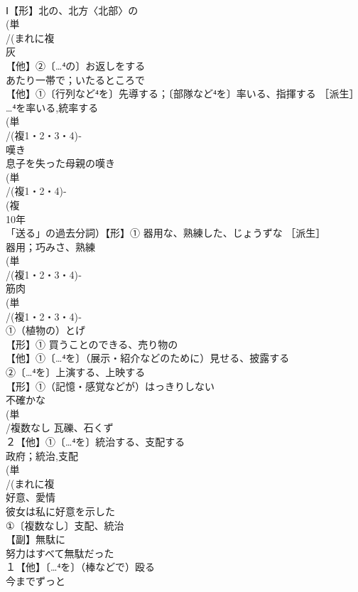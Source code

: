 \documentclass[8pt]{extreport}
\begin{document}
\begin{CJK}{UTF8}{min}
\\	Ⅰ【形】北の、北方〈北部〉の 
\\	(単
\\	/(まれに複
\\	灰 
\\	【他】②〔…⁴の〕お返しをする
\\	あたり一帯で；いたるところで
\\	【他】①〔行列など⁴を〕先導する；〔部隊など⁴を〕率いる、指揮する ［派生］ 
\\	…⁴を率いる,統率する
\\	(単
\\	/(複1・2・3・4)‐
\\	嘆き 
\\	息子を失った母親の嘆き
\\	(単
\\	/(複1・2・4)-
\\	(複
\\	10年 
\\	「送る」の過去分詞）【形】① 器用な、熟練した、じょうずな ［派生］ 
\\	器用；巧みさ、熟練
\\	(単
\\	/(複1・2・3・4)‐
\\	筋肉 
\\	(単
\\	/(複1・2・3・4)‐
\\	①（植物の）とげ 
\\	【形】① 買うことのできる、売り物の 
\\	【他】①〔…⁴を〕（展示・紹介などのために）見せる、披露する 
\\	②〔…⁴を〕上演する、上映する
\\	【形】①（記憶・感覚などが）はっきりしない　
\\	不確かな
\\	(単
\\	/複数なし 瓦礫、石くず
\\	２【他】①〔…⁴を〕統治する、支配する 
\\	政府；統治,支配
\\	(単
\\	/(まれに複
\\	好意、愛情 
\\	彼女は私に好意を示した
\\	①〔複数なし〕支配、統治 
\\	【副】無駄に 
\\	努力はすべて無駄だった
\\	１【他】〔…⁴を〕（棒などで）殴る 
\\	今までずっと

\end{CJK}
\end{document}
